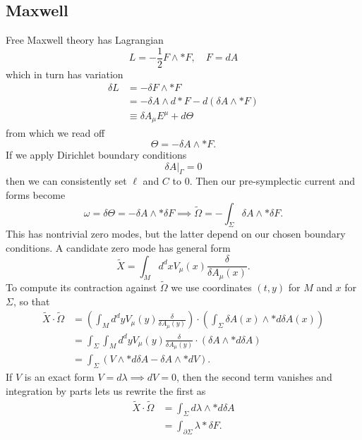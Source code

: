 \documentclass[11pt,letterpaper]{article}
\newcommand{\LP}{\left(}
\newcommand{\RP}{\right)}
\newcommand{\D}{\partial}
\begin{document}
\subsection{Maxwell}
Free Maxwell theory has Lagrangian \begin{equation}
L = - \frac{1}{2} F \wedge * F, \quad F = dA
\end{equation}
which in turn has variation \begin{equation} \begin{aligned}
\delta L & = - \delta F \wedge * F \\
& = - \delta A \wedge d * F - d (\delta A \wedge * F) \\
& \equiv \delta A_\mu E^\mu + d \Theta
\end{aligned}
\end{equation}
from which we read off \begin{equation}
\Theta = - \delta A \wedge * F.
\end{equation}
If we apply Dirichlet boundary conditions \begin{equation}
\delta A|_\Gamma = 0
\end{equation}
then we can consistently set $\ell$ and $C$ to $0$. Then our pre-symplectic current and forms become \begin{equation}
\omega = \delta \Theta = - \delta A \wedge * \delta F \implies \tilde{\Omega} = - \int_\Sigma \delta A \wedge * \delta F.
\end{equation}
This has nontrivial zero modes, but the latter depend on our chosen boundary conditions. A candidate zero mode has general form \begin{equation}
\tilde{X} = \int_M d^d x V_\mu(x) \frac{\delta}{\delta A_\mu(x)}.
\end{equation}
To compute its contraction against $\tilde{\Omega}$ we use coordinates $(t, y)$ for $M$ and $x$ for $\Sigma$, so that \begin{equation}
\begin{aligned}
\tilde{X} \cdot \tilde{\Omega} &= \LP \int_M d^d y  V_\mu(y) \frac{\delta}{\delta A_\mu(y)} \RP \cdot \LP \int_\Sigma \delta A(x) \wedge * d \delta A(x) \RP \\
& = \int_\Sigma  \int_M d^d y V_\mu(y) \frac{\delta}{\delta A_\mu(y)} \cdot \LP \delta A \wedge * d \delta A \RP \\
& = \int_\Sigma  \LP V \wedge * d \delta A  - \delta A \wedge * d V \RP.
\end{aligned}
\end{equation}
If $V$ is an exact form $V = d \lambda \implies dV = 0$, then the second term vanishes and integration by parts lets us rewrite the first as \begin{equation}
\begin{aligned}
\tilde{X} \cdot \tilde{\Omega} & = \int_\Sigma d \lambda \wedge * d \delta A \\
& = \int_{\D \Sigma} \lambda *  \delta F.
\end{aligned}
\end{equation}
\end{document}
